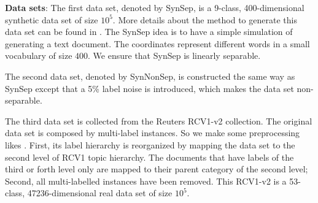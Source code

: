 \documentclass[preprint,12pt,authoryear]{elsarticle}
\begin{document}
\textbf{Data sets}:
The first data set, denoted by SynSep,  is a 9-class, 400-dimensional synthetic data set of size $10^5$. More details about the method to generate this data set can be found in \cite{kakade2008efficient}. The SynSep  idea is to have a simple simulation of generating a text document. The coordinates represent different words in a small vocabulary of size $400$. We ensure that SynSep is linearly separable. 

The second data set, denoted by SynNonSep, is constructed  the same way as  SynSep except that a 5\% label noise is introduced, which makes the data set non-separable. 

The third data set is collected from the Reuters RCV1-v2 collection\cite{David04RCV}. The original data set is composed by multi-label instances. So we make some preprocessing likes \cite{RB08a}. First, its label hierarchy is reorganized by mapping the data set to the second level of RCV1 topic hierarchy. The documents that have labels of the third or forth level only are mapped to their parent category of the second level; Second, all multi-labelled instances have been removed. This RCV1-v2 is a 53-class,  47236-dimensional real data set of size $10^5$. 

\end{document}
